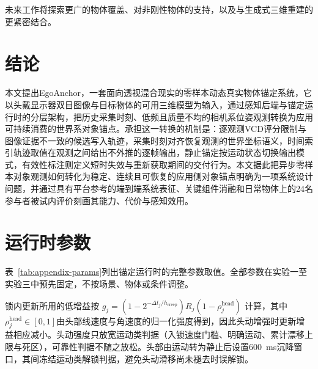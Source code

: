 \documentclass[review]{vgtc}
\begin{document}
未来工作将探索更广的物体覆盖、对非刚性物体的支持，以及与生成式三维重建的更紧密结合。

\section{结论}\label{sec:conclusion}

本文提出EgoAnchor，一套面向透视混合现实的零样本动态真实物体锚定系统，它以头戴显示器双目图像与目标物体的可用三维模型为输入，通过感知后端与锚定运行时的分层架构，把历史采集时刻、低频且质量不均的相机系位姿观测转换为应用可持续消费的世界系对象锚点。承担这一转换的机制是：逐观测VCD评分限制与图像证据不一致的候选写入轨迹，采集时刻对齐恢复观测的世界坐标语义，时间索引轨迹取值在观测之间给出不外推的逐帧输出，静止锚定按运动状态切换输出模式，有效性标注则定义短时失效与重新获取期间的交付行为。本文据此把异步零样本对象观测如何转化为稳定、连续且可恢复的应用侧对象锚点明确为一项系统设计问题，并通过具有平台参考的端到端系统表征、关键组件消融和日常物体上的24名参与者被试内评价刻画其能力、代价与感知效用。

\raggedbottom




\clearpage
\appendix

\section{运行时参数}\label{sec:appendix}

表~\ref{tab:appendix-params}列出锚定运行时的完整参数取值。全部参数在实验一至实验三中预先固定，不按场景、物体或条件调整。

锁内更新所用的低增益按
$g_j = (1 - 2^{-\Delta t_j / h_{\mathrm{creep}}}) R_j
(1 - \rho_j^{\mathrm{head}})$
计算，其中$\rho_j^{\mathrm{head}} \in [0,1]$由头部线速度与角速度的归一化强度得到，因此头动增强时更新增益相应减小。头动强度只放宽运动类判据（入锁速度门槛、明确运动、累计漂移上限与死区），可靠性判据不随之放松。头部由运动转为静止后设置600~ms沉降窗口，其间冻结运动类解锁判据，避免头动滑移尚未褪去时误解锁。
\end{document}
